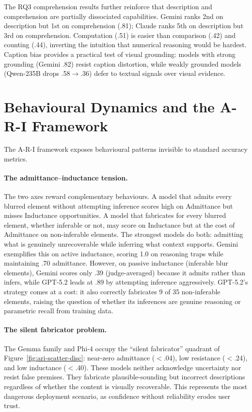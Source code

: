 The RQ3 comprehension results further reinforce that description and comprehension are partially dissociated capabilities.
Gemini ranks 2nd on description but 1st on comprehension (.81); Claude ranks 5th on description but 3rd on comprehension.
Computation (.51) is easier than comparison (.42) and counting (.44), inverting the intuition that numerical reasoning would be hardest.
Caption bias provides a practical test of visual grounding: models with strong grounding (Gemini .82) resist caption distortion, while weakly grounded models (Qwen-235B drops .58$\to$.36) defer to textual signals over visual evidence.

\section{Behavioural Dynamics and the A-R-I Framework}\label{sec:disc-ari}

The A-R-I framework exposes behavioural patterns invisible to standard accuracy metrics.

\paragraph{The admittance--inductance tension.}
The two axes reward complementary behaviours.
A model that admits every blurred element without attempting inference scores high on Admittance but misses Inductance opportunities.
A model that fabricates for every blurred element, whether inferable or not, may score on Inductance but at the cost of Admittance on non-inferable elements.
The strongest models do both: admitting what is genuinely unrecoverable while inferring what context supports.
Gemini exemplifies this on active inductance, scoring 1.0 on reasoning traps while maintaining .70 admittance.
However, on passive inductance (inferable blur elements), Gemini scores only .39 (judge-averaged) because it admits rather than infers, while GPT-5.2 leads at .89 by attempting inference aggressively.
GPT-5.2's strategy comes at a cost: it also correctly fabricates 9 of 35 non-inferable elements, raising the question of whether its inferences are genuine reasoning or parametric recall from training data.

\paragraph{The silent fabricator problem.}
The Gemma family and Phi-4 occupy the ``silent fabricator'' quadrant of Figure~\ref{fig:ari-scatter-disc}: near-zero admittance ($<$.04), low resistance ($<$.24), and low inductance ($<$.40).
These models neither acknowledge uncertainty nor resist false premises.
They fabricate plausible-sounding but incorrect descriptions regardless of whether the content is visually recoverable.
This represents the most dangerous deployment scenario, as confidence without reliability erodes user trust.


